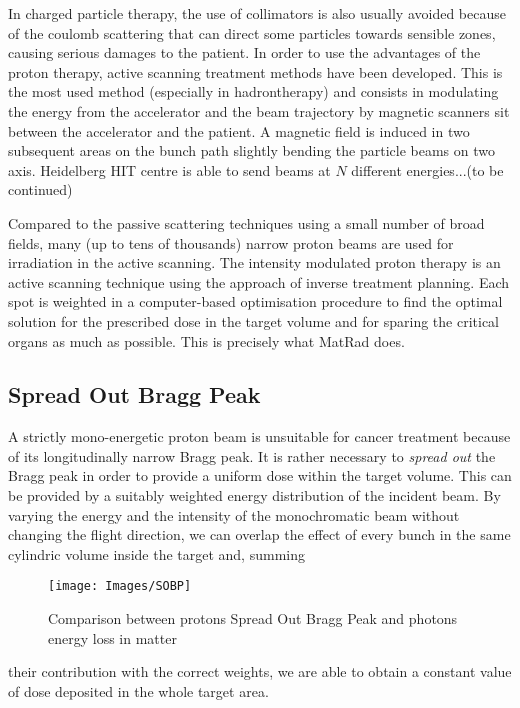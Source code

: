 \documentclass[12pt, a4paper, twoside]{book}
\begin{document}
In charged particle therapy, the use of collimators is also usually avoided because of the coulomb scattering that can direct some particles towards sensible zones, causing serious damages to the patient.%
In order to use the advantages of the proton therapy, active scanning treatment methods have been developed.
This is the most used method (especially in hadrontherapy) and consists in modulating the energy from the accelerator and the beam trajectory by magnetic scanners sit between the accelerator and the patient. A magnetic field is induced in two subsequent areas on the bunch path slightly bending the particle beams on two axis. 
Heidelberg HIT centre is able to send beams at $N$ different energies...(to be continued)

Compared to the passive scattering techniques using a small number of broad fields, many (up to tens of thousands) narrow proton beams are used for irradiation in the active scanning. The intensity modulated proton therapy is an active scanning technique using the approach of inverse treatment planning. Each spot is weighted in a computer-based optimisation procedure to find the optimal solution for the prescribed dose in the target volume and for sparing the critical organs as much as possible.
This is precisely what MatRad does.




\subsection{Spread Out Bragg Peak}
\label{sec:sobp}

A strictly mono-energetic proton beam is unsuitable for cancer treatment because of its longitudinally narrow Bragg peak. It is rather necessary to \emph{spread out} the Bragg peak in order to provide a uniform dose within the target volume. This can be provided by a suitably weighted energy distribution of the incident beam. 
By varying the energy and the intensity of the monochromatic beam without changing the flight direction, we can overlap the effect of every bunch in the same cylindric volume inside the target and, summing 
\begin{wrapfigure}{r}{.5\textwidth}
{\texttt{[image: Images/SOBP]}}
\caption{Comparison between protons Spread Out Bragg Peak and photons energy loss in matter}
\label{fig:SOPB}
\end{wrapfigure}
\noindent their contribution with the correct weights, we are able to obtain a constant value of dose deposited in the whole target area.
\end{document}
